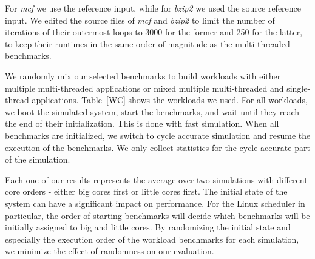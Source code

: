 For \emph{mcf} we use the reference input, while for \textit{bzip2} we used the source reference input. We edited the source files of \textit{mcf} and \textit{bzip2} to limit the number of iterations of their outermost loops to 3000 for the former and 250 for the latter, to keep their runtimes in the same order of magnitude as the multi-threaded benchmarks.

We randomly mix our selected benchmarks to build workloads with either multiple multi-threaded applications or mixed multiple multi-threaded and single-thread applications. Table~\ref{WC} shows the workloads we used. For all workloads, we boot the simulated system, start the benchmarks, and wait until they reach the end of their initialization. This is done with fast simulation. When all benchmarks are initialized, we switch to cycle accurate simulation and resume the execution of the benchmarks. We only collect statistics for the cycle accurate part of the simulation.

Each one of our results represents the average over two simulations with different core orders - either big cores first or little cores first. The initial state of the system can have a significant impact on performance. For the Linux scheduler in particular, the order of starting benchmarks will decide which benchmarks will be initially assigned to big and little cores. By randomizing the initial state and especially the execution order of the workload benchmarks for each simulation, we minimize the effect of randomness on our evaluation.


